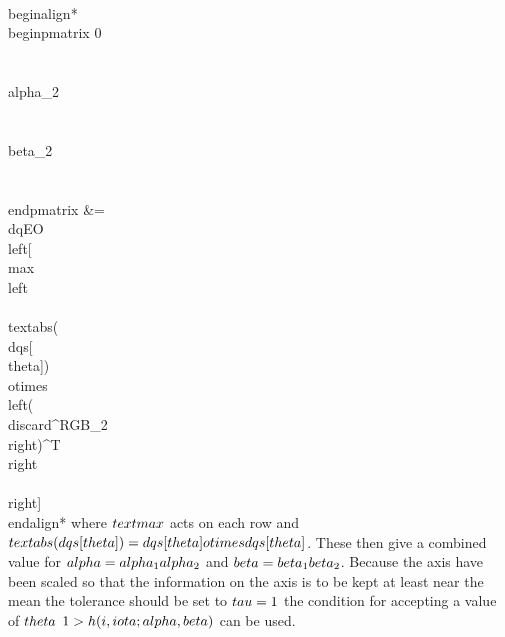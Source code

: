 \\begin{align*}
 \\begin{pmatrix}  0   \\\\   \\alpha_2   \\\\  \\beta_2   \\\\ \\end{pmatrix}     &=  
\\dqEO\\left[  
\\max \\left\\{\\text{abs}(\\dqs[\\theta]) \\otimes \\left(\\discard^{RGB}_2 \\right)^T \\right\\}
\\right]
\\end{align*}
where $\\text{max}$ acts on each row and $\\text{abs}(\\dqs[\\theta])  = \\dqs[\\theta] \\otimes \\dqs[\\theta]$. 
These then give a combined value for $\\alpha = \\alpha_1 \\alpha_2$ and $\\beta = \\beta_1 \\beta_2$. Because the axis have been scaled so that the information on the axis is to be kept at least near the mean the tolerance should be set to $\\tau =1$ the condition for accepting a value of $\\theta$ $1 > h(i,\\iota; \\alpha,\\beta)$ can be used.

